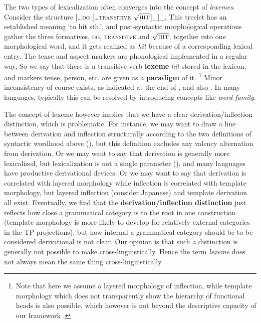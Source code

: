 \documentclass[UTF8, a4paper, oneside, scheme=plain, 12pt]{ctexrep}
\newcommand*{\concept}[1]{\textbf{#1}}
\newcommand*{\term}[1]{\emph{#1}}
\newcommand{\form}[1]{\emph{#1}}
\newcommand{\translate}[1]{`#1'}
\newcommand*{\category}[1]{\textsc{#1}}
\newcommand*{\wordroot}[1]{$\sqrt{\text{\textsc{#1}}}$}
\begin{document}
{The two types of lexicalization often converges into the concept of \emph{lexemes}.
Consider the structure [\dots \category{do} [\dots \category{transitive} \wordroot{hit}]_{}]_{}.
This treelet has an established meaning \translate{to hit sth.},
and post-syntactic morphological operations gather the three formatives,
\category{do}, \category{transitive} and \wordroot{hit}, together into one morphological word,
and it gets realized as \form{hit} because of a corresponding lexical entry.
The tense and aspect markers are phonological implemented in a regular way,
So we say that there is a transitive verb \concept{lexeme} \form{hit} stored in the lexicon,
and markers tense, person, etc. are given as a \concept{paradigm} of it.%
\footnote{
    Note that here we assume a layered morphology of inflection,
    while template morphology which does not transparently show the hierarchy of functional heads
    is also possible, which however is not beyond the descriptive capacity of our framework
    \citep{bye2020morpheme}.
}
Minor inconsistency of course exists,
as indicated at the end of ,
and also .
In many languages, typically this can be resolved by introducing concepts like \term{word family}.

The concept of lexeme however implies that we have a clear derivation/inflection distinction, which is problematic.
For instance, we may want to draw a line between derivation and inflection structurally
according to the two definitions of syntactic wordhood above (),
but this definition excludes any valency alternation from derivation.
Or we may want to say that derivation is generally more lexicalized,
but lexicalization is not a single parameter (),
and many languages have productive derivational devices.
Or we may want to say that derivation is correlated with layered morphology
while inflection is correlated with template morphology,
but layered inflection (consider Japanese)
and template derivation all exist.
Eventually, we find that the \concept{derivation/inflection distinction}
just reflects how close a grammatical category is to the root in one construction
(template morphology is more likely to develop for
relatively external categories in the TP projections),
but how internal a grammatical category should be to be considered derivational is not clear.
Our opinion is that such a distinction is generally not possible to make cross-linguistically.
Hence the term \term{lexeme} does not always mean the same thing cross-linguistically.

}
\end{document}
